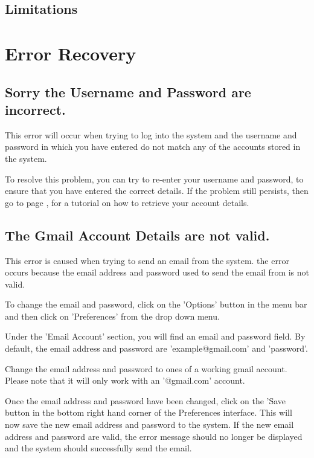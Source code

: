 \subsection{Limitations}

\section{Error Recovery}

\subsection{Sorry the Username and Password are incorrect.}

This error will occur when trying to log into the system and the username and password in which you have entered do not match any of the accounts stored in the system.

To resolve this problem, you can try to re-enter your username and password, to ensure that you have entered the correct details. If the problem still persists, then go to page \pageref{fig:Forgetting Your User-name or Password}, for a tutorial on how to retrieve your account details.

\subsection{The Gmail Account Details are not valid.}

This error is caused when trying to send an email from the system. the error occurs because the email address and password used to send the email from is not valid.

To change the email and password, click on the 'Options' button in the menu bar and then click on 'Preferences' from the drop down menu.

Under the 'Email Account' section, you will find an email and password field. By default, the email address and password are 'example@gmail.com' and 'password'.

Change the email address and password to ones of a working gmail account. Please note that it will only work with an '@gmail.com' account.

Once the email address and password have been changed, click on the 'Save button in the bottom right hand corner of the Preferences interface. This will now save the new email address and password to the system. If the new email address and password are valid, the error message should no longer be displayed and the system should successfully send the email.

